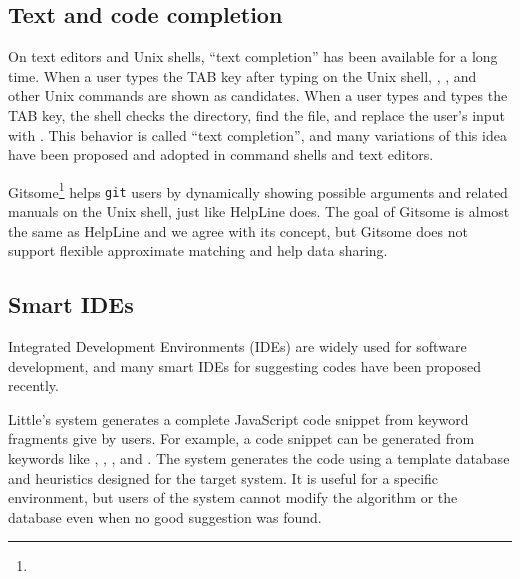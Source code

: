 \documentclass[manuscript,anonymous,review]{acmart}
\def\HL{\textsf{HelpLine}}
\def\GIT{\texttt{git}}
\begin{document}
\subsection{Text and code completion}

On text editors and Unix shells,
``text completion'' has been available for a long time.
%
When a user types the TAB key after typing  on the Unix shell,
, , and other Unix commands are shown as candidates.
When a user types  and types the TAB key,
the shell checks the directory, find the  file, and
replace the user's input with .
This behavior is called ``text completion'', and many variations of
this idea have been proposed and adopted in command shells and text editors.


Gitsome\footnote{
} helps {\GIT} users by
dynamically showing possible arguments and related manuals on the Unix shell,
just like {\HL} does.
The goal of Gitsome is almost the same as {\HL} and we agree with its concept,
but Gitsome does not support flexible approximate matching and
help data sharing.

\subsection{Smart IDEs}

Integrated Development Environments (IDEs) are widely used for
software development, and
many smart IDEs for suggesting codes have been proposed recently.

Little's system\cite{Little:2006:TKC:1166253.1166275}
generates a complete JavaScript code snippet from keyword fragments
give by users.
For example, a code snippet
can be generated from keywords like
,
,
,
and .
The system generates the code using a template database and heuristics
designed for the target system.
It is useful for a specific environment, but
users of the system cannot modify the algorithm or the database
even when no good suggestion was found.

\end{document}
